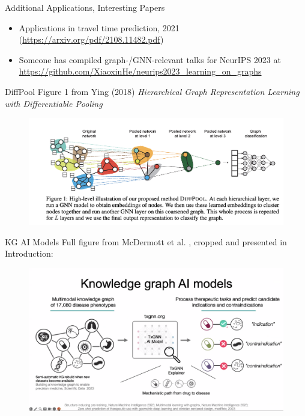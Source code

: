 \documentclass{beamer}
\begin{document}
\begin{frame}[allowframebreaks]{Additional Applications, Interesting Papers}
    \begin{itemize}
        \item Applications in travel time prediction, 2021 (\url{https://arxiv.org/pdf/2108.11482.pdf})
        \item Someone has compiled graph-/GNN-relevant talks for NeurIPS 2023 at \url{https://github.com/XiaoxinHe/neurips2023_learning_on_graphs}
    \end{itemize}
\end{frame}

\begin{frame}{DiffPool}
    Figure 1 from Ying (2018) {\it Hierarchical Graph Representation Learning with Differentiable Pooling} \cite{ying_hierarchical_2018}
    \begin{figure}
        \centering 
        \includegraphics[scale=0.45]{DIFFPOOL_RexYing.png}
    \end{figure}
\end{frame}

\begin{frame}{KG AI Models}
    Full figure from McDermott et al. \cite{mcdermott_structure-inducing_2023}, cropped and presented in Introduction:
    \begin{figure}
        \centering
        \includegraphics[scale=0.13]{Junwei_KG_Models_Infograph.png}
    \end{figure}
\end{frame}
\end{document}
